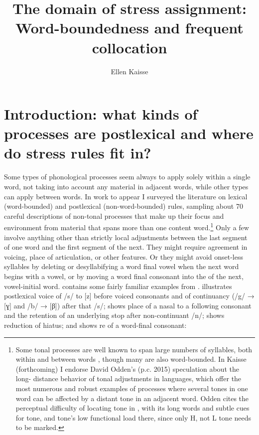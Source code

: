 \documentclass[output=paper,
modfonts
]{LSP/langsci}
\title{The domain of stress assignment: Word-boundedness and frequent collocation}
\author{%
Ellen Kaisse\affiliation{University of Washington}
}
\begin{document}
\maketitle

\section{Introduction: what kinds of processes are postlexical and where do stress rules fit in?}\label{sec:kaisse:1}
Some types of phonological processes seem always to apply solely within a single word, not taking into account any material in adjacent words, while other types can apply between words. In work to appear \citep{kaisseforthcoming} I surveyed the literature on lexical (word-bounded) and postlexical (non-word-bounded) rules, sampling about 70 careful descriptions of non-tonal processes that make up their focus and environment from material that spans more than one content word.\footnote{Some tonal processes are well known to span large numbers of syllables, both within and between words \citep{hyman2011}, though many are also word-bounded. In Kaisse (forthcoming) I endorse David Odden’s (p.c. 2015) speculation about the long- distance behavior of tonal adjustments in  languages, which offer the most numerous and robust examples of processes where several tones in one word can be affected by a distant tone in an adjacent word. Odden cites the perceptual difficulty of locating tone in , with its long words and subtle cues for tone, and tone’s low functional load there, since only H, not L tone needs to be marked.} Only a few involve anything other than strictly local adjustments between the last segment of one word and the first segment of the next. They might require agreement in voicing, place of articulation, or other features. Or they might avoid onset-less syllables by deleting or desyllabifying a word final vowel when the next word begins with a vowel, or by moving a word final consonant into the  of the next, vowel-initial word.  contains some fairly familiar examples from .  illustrates postlexical voice  of /s/ to [z] before voiced consonants and  of continuancy (/g/ → [ɣ] and /b/ → [β]) after that /s/;  shows place  of a nasal to a following consonant and the retention of an underlying stop after non-continuant /n/;  shows reduction of hiatus; and  shows re of a word-final consonant:
\end{document}
